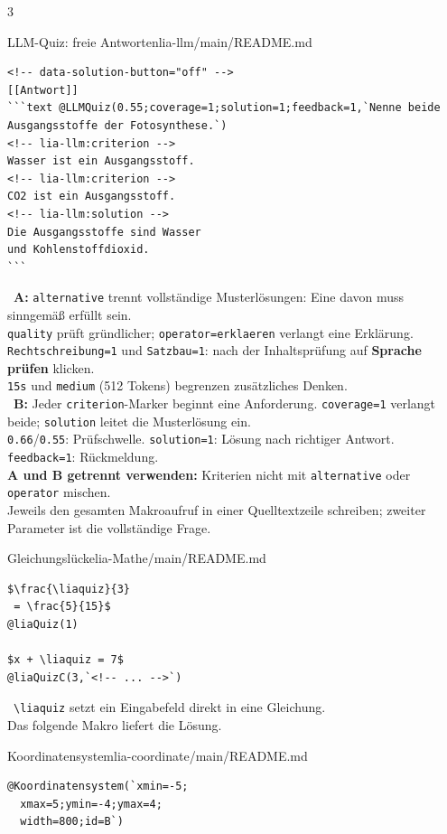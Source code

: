 \documentclass[a4paper,landscape,9pt]{extarticle}
\newcommand{\prevsm}[1]{{\footnotesize\color{muted} #1}}
\begin{document}
\begin{multicols}{3}
\begin{schulcard}{LLM-Quiz: freie Antworten}{lia-llm/main/README.md}
\begin{lstlisting}[language=lia,breakatwhitespace=false,breakautoindent=false]
<!-- data-solution-button="off" -->
[[Antwort]]
```text @LLMQuiz(0.55;coverage=1;solution=1;feedback=1,`Nenne beide Ausgangsstoffe der Fotosynthese.`)
<!-- lia-llm:criterion -->
Wasser ist ein Ausgangsstoff.
<!-- lia-llm:criterion -->
CO2 ist ein Ausgangsstoff.
<!-- lia-llm:solution -->
Die Ausgangsstoffe sind Wasser
und Kohlenstoffdioxid.
```
\end{lstlisting}
\tcblower
\prevsm{\faComments~\textbf{A:} \texttt{alternative} trennt vollständige Musterlösungen: Eine davon muss sinngemäß erfüllt sein.\\[3pt]
\texttt{quality} prüft gründlicher; \texttt{operator=erklaeren} verlangt eine Erklärung.\\[3pt]
\texttt{Rechtschreibung=1} und \texttt{Satzbau=1}: nach der Inhaltsprüfung auf \textbf{Sprache prüfen} klicken.\\[3pt]
\texttt{15s} und \texttt{medium} (512 Tokens) begrenzen zusätzliches Denken.\\[3pt]
\faTasks~\textbf{B:} Jeder \texttt{criterion}-Marker beginnt eine Anforderung. \texttt{coverage=1} verlangt beide; \texttt{solution} leitet die Musterlösung ein.\\[3pt]
\texttt{0.66}/\texttt{0.55}: Prüfschwelle. \texttt{solution=1}: Lösung nach richtiger Antwort. \texttt{feedback=1}: Rückmeldung.\\[3pt]
\textbf{A und B getrennt verwenden:} Kriterien nicht mit \texttt{alternative} oder \texttt{operator} mischen.\\[3pt]
Jeweils den gesamten Makroaufruf in einer Quelltextzeile schreiben; zweiter Parameter ist die vollständige Frage.}
\end{schulcard}

\begin{schulcard}{Gleichungslücke}{lia-Mathe/main/README.md}
\begin{lstlisting}[language=lia]
$\frac{\liaquiz}{3}
 = \frac{5}{15}$
@liaQuiz(1)

$x + \liaquiz = 7$
@liaQuizC(3,`<!-- ... -->`)
\end{lstlisting}
\tcblower
\prevsm{\faFlask~\texttt{\textbackslash liaquiz} setzt ein Eingabefeld direkt in eine Gleichung.\\[2pt]
Das folgende Makro liefert die Lösung.}
\end{schulcard}

\begin{schulcard}{Koordinatensystem}{lia-coordinate/main/README.md}
\begin{lstlisting}[language=lia]
@Koordinatensystem(`xmin=-5;
  xmax=5;ymin=-4;ymax=4;
  width=800;id=B`)


\end{lstlisting}
\end{schulcard}
\end{multicols}
\end{document}
